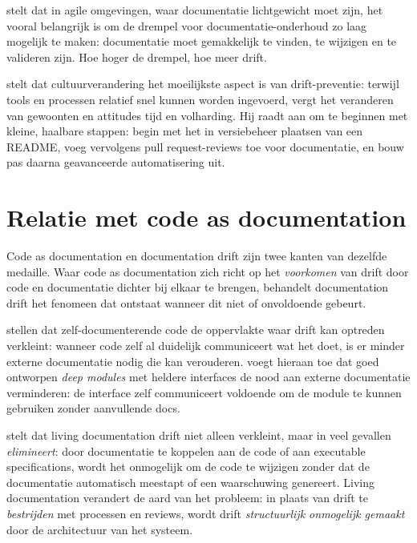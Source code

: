 \textcite{ruping2005agiledocumentation} stelt dat in agile omgevingen, waar documentatie lichtgewicht moet zijn, het vooral belangrijk is om de drempel voor documentatie-onderhoud zo laag mogelijk te maken: documentatie moet gemakkelijk te vinden, te wijzigen en te valideren zijn. Hoe hoger de drempel, hoe meer drift.

\textcite{martraire2019livingdocumentation} stelt dat cultuurverandering het moeilijkste aspect is van drift-preventie: terwijl tools en processen relatief snel kunnen worden ingevoerd, vergt het veranderen van gewoonten en attitudes tijd en volharding. Hij raadt aan om te beginnen met kleine, haalbare stappen: begin met het in versiebeheer plaatsen van een README, voeg vervolgens pull request-reviews toe voor documentatie, en bouw pas daarna geavanceerde automatisering uit.

\section{Relatie met code as documentation}
\label{sec:drift-relatie-cad}

Code as documentation en documentation drift zijn twee kanten van dezelfde medaille. Waar code as documentation zich richt op het \textit{voorkomen} van drift door code en documentatie dichter bij elkaar te brengen, behandelt documentation drift het fenomeen dat ontstaat wanneer dit niet of onvoldoende gebeurt.

\textcite{boswell2011readablecode} stellen dat zelf-documenterende code de oppervlakte waar drift kan optreden verkleint: wanneer code zelf al duidelijk communiceert wat het doet, is er minder externe documentatie nodig die kan verouderen. \textcite{ousterhout2018philosophy} voegt hieraan toe dat goed ontworpen \textit{deep modules} met heldere interfaces de nood aan externe documentatie verminderen: de interface zelf communiceert voldoende om de module te kunnen gebruiken zonder aanvullende docs.

\textcite{martraire2019livingdocumentation} stelt dat living documentation drift niet alleen verkleint, maar in veel gevallen \textit{elimineert}: door documentatie te koppelen aan de code of aan executable specifications, wordt het onmogelijk om de code te wijzigen zonder dat de documentatie automatisch meestapt of een waarschuwing genereert. Living documentation verandert de aard van het probleem: in plaats van drift te \textit{bestrijden} met processen en reviews, wordt drift \textit{structuurlijk onmogelijk gemaakt} door de architectuur van het systeem.

